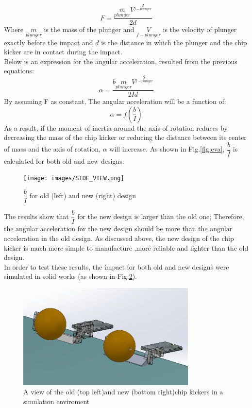 \begin{equation}
F=\dfrac{m\limits_{plunger} {V}^2\limits_{f-plunger}}{2d}
\end{equation}
Where $m\limits_{plunger}$ is the mass of the plunger and ${V}\limits_{f-plunger}$ is the velocity of plunger exactly before the impact and $d$ is the distance in which the plunger and the chip kicker are in contact during the impact.\\
Below is an expression for the angular acceleration, resulted from the previous equations:
\begin{equation}
\alpha = \dfrac{b m\limits_{plunger} {V}^2\limits_{f-plunger}}{2Id}
\end{equation}
By assuming F as constant, The angular acceleration will be a function of:
\begin{equation}
\alpha=f(\dfrac{b}{I})
\end{equation}
As a result, if the moment of inertia around the axis of rotation reduces by decreasing the mass of the chip kicker or reducing the distance between its center of mass and the axis of rotation, $\alpha$ will increase.
As shown in Fig.\ref{fig:eva}, $\dfrac{b}{I}$ is calculated for both old and new designs:
\begin{figure}
	\centering
	\texttt{[image: images/SIDE\_VIEW.png]}
	\caption{$\dfrac{b}{I}$ for old (left) and new (right) design}
	\label{fig:CHIP_SIDE_VIEW}
\end{figure}
The results show that $\dfrac{b}{I}$ for the new design is larger than the old one; Therefore, the angular acceleration for the new design should be more than the angular acceleration in the old design. As discussed above, the new design of the chip kicker is much more simple to manufacture ,more reliable and lighter than the old design. %
\\
In order to test these results, the impact for both old and new designs were simulated in solid works (as shown in Fig.\ref{fig:SIM2CHIP}).\\
\begin{figure}
	\centering
	\includegraphics[width=0.8\textwidth]{images/SIM_CHIPx2.png}
	\caption{A view of the old (top left)and new (bottom right)chip kickers in a simulation enviroment}
	\label{fig:SIM2CHIP}
\end{figure}\\
